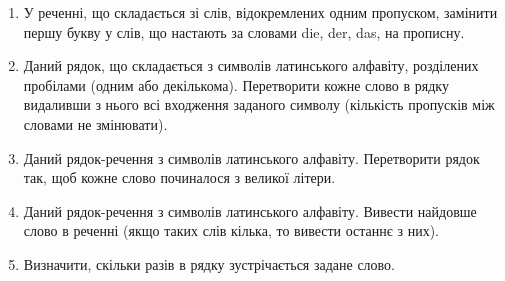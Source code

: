 \documentclass[]{article}
\begin{document}
\begin{enumerate}
\item
У реченні, що складається зі слів,
відокремлених одним пропуском, замінити першу букву у слів, що настають
за словами die, der, das, на прописну.
\item
Даний рядок, що складається з
символів латинського алфавіту, розділених пробілами (одним або
декількома). Перетворити кожне слово в рядку видаливши з нього всі
входження заданого символу (кількість пропусків між словами не
змінювати).
\item
Даний рядок-речення з символів латинського алфавіту. Перетворити рядок
так, щоб кожне слово починалося з великої літери.
\item
Даний рядок-речення з символів латинського алфавіту. Вивести найдовше
слово в реченні (якщо таких слів кілька, то вивести останнє з них).
\item
Визначити, скільки разів в рядку зустрічається задане слово.


\end{enumerate}
\end{document}
